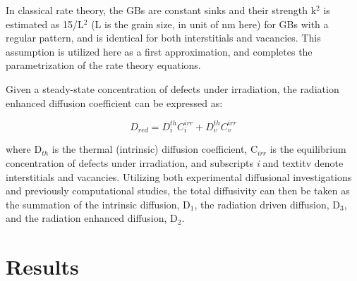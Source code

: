 \documentclass[10pt,review]{elsarticle}
\begin{document}
In classical rate theory, the GBs are constant sinks and their strength k$^2$ is estimated as 15/L$^2$ (L is the grain size, in unit of nm here) for GBs with a regular pattern, and is identical for both interstitials and vacancies. This assumption is utilized here as a first approximation, and completes the parametrization of the rate theory equations.

Given a steady-state concentration of defects under irradiation, the radiation enhanced diffusion coefficient can be expressed as:

\begin{equation}
\label{eq:4}
D_{red} = D^{th}_iC^{irr}_i + D^{th}_vC^{irr}_v
\end{equation}

where D$_{th}$ is the thermal (intrinsic) diffusion coefficient, C$_{irr}$ is the equilibrium concentration of defects under irradiation, and subscripts \textit{i} and textit{v} denote interstitials and vacancies. Utilizing both experimental diffusional investigations and previously computational studies, the total diffusivity can then be taken as the summation of the intrinsic diffusion, D$_1$, the radiation driven diffusion, D$_3$, and the radiation enhanced diffusion, D$_2$.


\section{Results}
\end{document}
